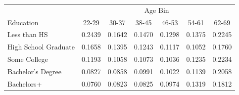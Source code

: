 \begin{tabular}{lcccccc}
\hline\hline
 & \multicolumn{6}{c}{Age Bin} \\
Education & 22-29 & 30-37 & 38-45 & 46-53 & 54-61 & 62-69 \\
\hline
Less than HS&0.2439&0.1642&0.1470&0.1298&0.1375&0.2245\\
High School Graduate&0.1658&0.1395&0.1243&0.1117&0.1052&0.1760\\
Some College&0.1193&0.1058&0.1073&0.1036&0.1235&0.2234\\
Bachelor's Degree&0.0827&0.0858&0.0991&0.1022&0.1139&0.2058\\
Bachelors+&0.0760&0.0823&0.0825&0.0974&0.1319&0.1812\\
\hline\hline
\end{tabular}
